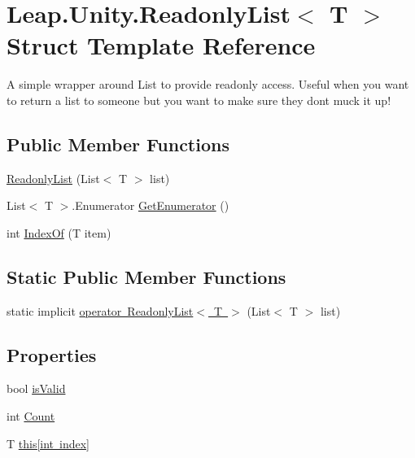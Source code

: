 \hypertarget{struct_leap_1_1_unity_1_1_readonly_list}{}\section{Leap.\+Unity.\+Readonly\+List$<$ T $>$ Struct Template Reference}
\label{struct_leap_1_1_unity_1_1_readonly_list}


A simple wrapper around List to provide readonly access. Useful when you want to return a list to someone but you want to make sure they don\textquotesingle{}t muck it up!  


\subsection*{Public Member Functions}
\begin{DoxyCompactItemize}
\item 
\mbox{\hyperlink{struct_leap_1_1_unity_1_1_readonly_list_a1fb8e8769054f9900e5137bbb12c8f93}{Readonly\+List}} (List$<$ T $>$ list)
\item 
List$<$ T $>$.Enumerator \mbox{\hyperlink{struct_leap_1_1_unity_1_1_readonly_list_adc0d4de6f9f71a6efc8e231aa2fd82e0}{Get\+Enumerator}} ()
\item 
int \mbox{\hyperlink{struct_leap_1_1_unity_1_1_readonly_list_ae32d6b84fbdb9944a0da61e3eb7b40ec}{Index\+Of}} (T item)
\end{DoxyCompactItemize}
\subsection*{Static Public Member Functions}
\begin{DoxyCompactItemize}
\item 
static implicit \mbox{\hyperlink{struct_leap_1_1_unity_1_1_readonly_list_af573d8a676fcbdbad7cf6397507da7a7}{operator Readonly\+List$<$ T $>$}} (List$<$ T $>$ list)
\end{DoxyCompactItemize}
\subsection*{Properties}
\begin{DoxyCompactItemize}
\item 
bool \mbox{\hyperlink{struct_leap_1_1_unity_1_1_readonly_list_a236442582c937fc2af0f62466c0a2327}{is\+Valid}}
\item 
int \mbox{\hyperlink{struct_leap_1_1_unity_1_1_readonly_list_ac6737458ce4d5bab0da5403a5bee2673}{Count}}
\item 
T \mbox{\hyperlink{struct_leap_1_1_unity_1_1_readonly_list_aff841005de7b62f81fb89e12056e4e3f}{this\mbox{[}int index\mbox{]}}}
\end{DoxyCompactItemize}


